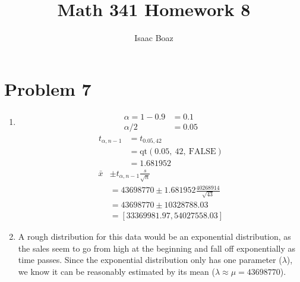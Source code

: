 \documentclass{article}
\title{\vspace{-4ex}Math 341 Homework 8}
\author{Isaac Boaz}
\begin{document}
\maketitle

\pagebreak

\section*{Problem 7}
\begin{enumerate}[label=(\alph*)]
    \item \begin{align*}
              \alpha = 1 - 0.9 & = 0.1  \\
              \alpha/2         & = 0.05
          \end{align*}
          \begin{align*}
              t_{\alpha, n-1} & = t_{0.05, 42}                        \\
                              & = \text{qt}(0.05,\ 42,\ \text{FALSE}) \\
                              & = 1.681952
          \end{align*}
          \begin{align*}
              \bar{x} & \pm t_{\alpha, n-1} \frac{s}{\sqrt{n}}             \\
                      & = 43698770 \pm 1.681952 \frac{40268914}{\sqrt{43}} \\
                      & = 43698770 \pm 10328788.03                         \\
                      & = [33369981.97, 54027558.03]
          \end{align*}
    \item
          \setlength{\columnsep}{-1.6in}
          \begin{multicols}{2}
              A rough distribution for this data would be an exponential distribution, as the sales seem to go from high at the beginning and fall off exponentially as time passes.
              Since the exponential distribution only has one parameter (\(\lambda\)), we know it can be reasonably estimated by its mean (\(\lambda \approx \mu = 43698770\)).
              \columnbreak

\end{multicols}
\end{enumerate}
\end{document}
